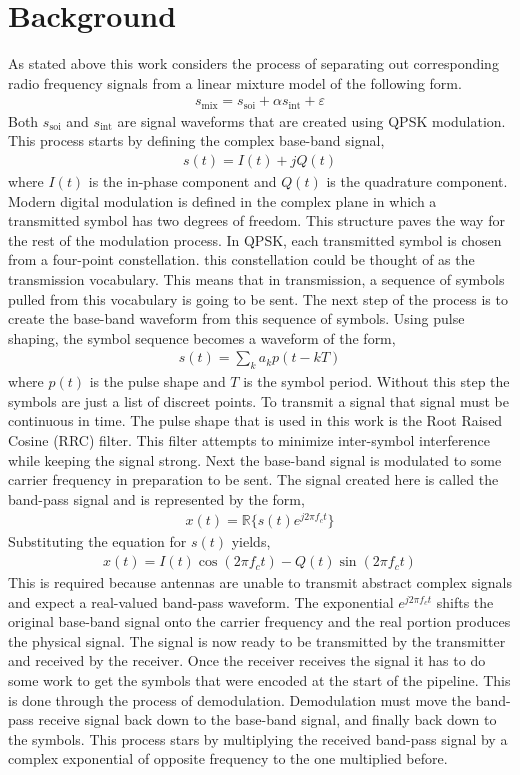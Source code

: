 \documentclass[conference]{IEEEtran}
\begin{document}
\section{Background}
As stated above this work considers the process of separating out corresponding radio frequency signals from a linear mixture model of the following form.
\begin{align*}
    s_{\text{mix}} = s_{\text{soi}} + \alpha s_{\text{int}} + \varepsilon
\end{align*}
Both $s_{\text{soi}}$ and $s_{\text{int}}$ are signal waveforms that are created using QPSK modulation. This process starts by defining the complex base-band signal,
\begin{align*}
    s(t) = I(t) + jQ(t)
\end{align*}
where $I(t)$ is the in-phase component and $Q(t)$ is the quadrature component. Modern digital modulation is defined in the complex plane in which a transmitted symbol has two degrees of freedom. This structure paves the way for the rest of the modulation process. In QPSK, each transmitted symbol is chosen from a four-point constellation. this constellation could be thought of as the transmission vocabulary. This means that in transmission, a sequence of symbols pulled from this vocabulary is going to be sent. The next step of the process is to create the base-band waveform from this sequence of symbols. Using pulse shaping, the symbol sequence becomes a waveform of the form,
\begin{align*}
    s(t) = \sum_ka_kp(t-kT)
\end{align*}
where $p(t)$ is the pulse shape and $T$ is the symbol period. Without this step the symbols are just a list of discreet points. To transmit a signal that signal must be continuous in time. The pulse shape that is used in this work is the Root Raised Cosine (RRC) filter. This filter attempts to minimize inter-symbol interference while keeping the signal strong. Next the base-band signal is modulated to some carrier frequency in preparation to be sent. The signal created here is called the band-pass signal and is represented by the form,
\begin{align*}
    x(t) = \mathbb{R}\{{{s(t)e^{j2\pi f_ct}}}\}
\end{align*}
Substituting the equation for $s(t)$ yields,
\begin{align*}
    x(t) = I(t)\cos{(2\pi f_ct)} - Q(t)\sin{(2\pi f_ct)}
\end{align*}
This is required because antennas are unable to transmit abstract complex signals and expect a real-valued band-pass waveform. The exponential $e^{j2\pi f_ct}$ shifts the original base-band signal onto the carrier frequency and the real portion produces the physical signal. The signal is now ready to be transmitted by the transmitter and received by the receiver. Once the receiver receives the signal it has to do some work to get the symbols that were encoded at the start of the pipeline. This is done through the process of demodulation. Demodulation must move the band-pass receive signal back down to the base-band signal, and finally back down to the symbols. This process stars by multiplying the received band-pass signal by a complex exponential of opposite frequency to the one multiplied before.
\end{document}
